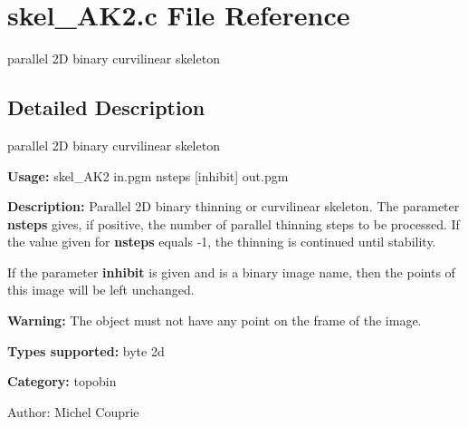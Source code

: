 \section{skel\_\-AK2.c File Reference}
\label{skel__AK2_8c}
parallel 2D binary curvilinear skeleton 



\subsection{Detailed Description}
parallel 2D binary curvilinear skeleton 

{\bf Usage:} skel\_\-AK2 in.pgm nsteps [inhibit] out.pgm

{\bf Description:} Parallel 2D binary thinning or curvilinear skeleton. The parameter {\bf nsteps} gives, if positive, the number of parallel thinning steps to be processed. If the value given for {\bf nsteps} equals -1, the thinning is continued until stability.

If the parameter {\bf inhibit} is given and is a binary image name, then the points of this image will be left unchanged.

{\bf Warning:} The object must not have any point on the frame of the image.

{\bf Types supported:} byte 2d

{\bf Category:} topobin

\begin{Desc}
\item[Author:]Michel Couprie \end{Desc}
